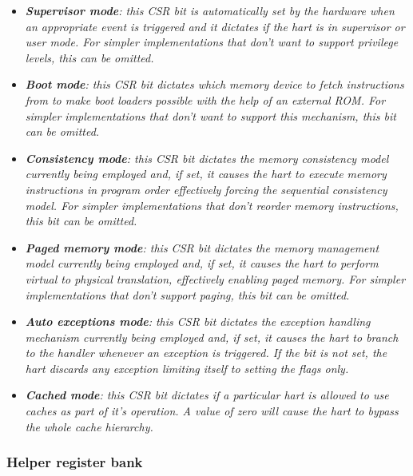             \begin{itemize}

                \item \textit{\textbf{Supervisor mode}: this CSR bit is automatically set by the hardware when an appropriate event is triggered and it dictates if the hart is in supervisor or user mode. For simpler implementations that don't want to support privilege levels, this can be omitted.}

                \item \textit{\textbf{Boot mode}: this CSR bit dictates which memory device to fetch instructions from to make boot loaders possible with the help of an external ROM. For simpler implementations that don't want to support this mechanism, this bit can be omitted.}

                \item \textit{\textbf{Consistency mode}: this CSR bit dictates the memory consistency model currently being employed and, if set, it causes the hart to execute memory instructions in program order effectively forcing the sequential consistency model. For simpler implementations that don't reorder memory instructions, this bit can be omitted.}

                \item \textit{\textbf{Paged memory mode}: this CSR bit dictates the memory management model currently being employed and, if set, it causes the hart to perform virtual to physical translation, effectively enabling paged memory. For simpler implementations that don't support paging, this bit can be omitted.}

                \item \textit{\textbf{Auto exceptions mode}: this CSR bit dictates the exception handling mechanism currently being employed and, if set, it causes the hart to branch to the handler whenever an exception is triggered. If the bit is not set, the hart discards any exception limiting itself to setting the flags only.}

                \item \textit{\textbf{Cached mode}: this CSR bit dictates if a particular hart is allowed to use caches as part of it's operation. A value of zero will cause the hart to bypass the whole cache hierarchy.}

            \end{itemize}

        \subsubsection{Helper register bank}

